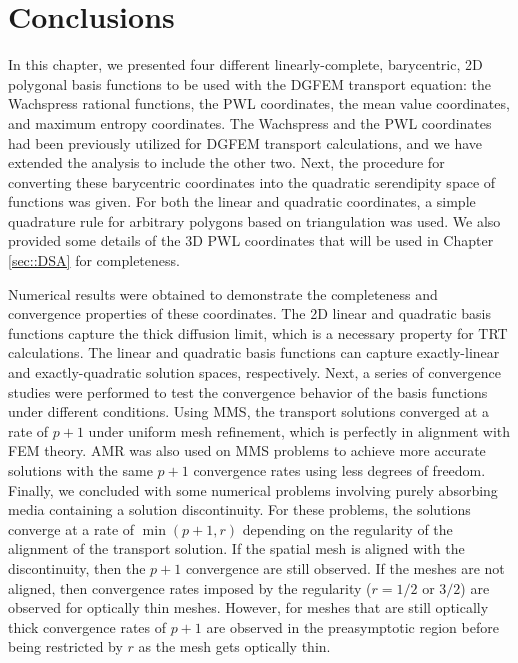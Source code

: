 \section{Conclusions}
\label{sec::BF_Conclusions}

In this chapter, we presented four different linearly-complete, barycentric, 2D polygonal basis functions to be used with the DGFEM transport equation: the Wachspress rational functions, the PWL coordinates, the mean value coordinates, and maximum entropy coordinates. The Wachspress and the PWL coordinates had been previously utilized for DGFEM transport calculations, and we have extended the analysis to include the other two. Next, the procedure for converting these barycentric coordinates into the quadratic serendipity space of functions was given. For both the linear and quadratic coordinates, a simple quadrature rule for arbitrary polygons based on triangulation was used. We also provided some details of the 3D PWL coordinates that will be used in Chapter \ref{sec::DSA} for completeness.

Numerical results were obtained to demonstrate the completeness and convergence properties of these coordinates. The 2D linear and quadratic basis functions capture the thick diffusion limit, which is a necessary property for TRT calculations. The linear and quadratic basis functions can capture exactly-linear and exactly-quadratic solution spaces, respectively. Next, a series of convergence studies were performed to test the convergence behavior of the basis functions under different conditions. Using MMS, the transport solutions converged at a rate of $p+1$ under uniform mesh refinement, which is perfectly in alignment with FEM theory. AMR was also used on MMS problems to achieve more accurate solutions with the same $p+1$ convergence rates using less degrees of freedom. Finally, we concluded with some numerical problems involving purely absorbing media containing a solution discontinuity. For these problems, the solutions converge at a rate of $\min ( p+1 , r)$ depending on the regularity of the alignment of the transport solution. If the spatial mesh is aligned with the discontinuity, then the $p+1$ convergence are still observed. If the meshes are not aligned, then convergence rates imposed by the regularity ($r=1/2$ or $3/2$) are observed for optically thin meshes. However, for meshes that are still optically thick convergence rates of $p+1$ are observed in the preasymptotic region before being restricted by $r$ as the mesh gets optically thin.





